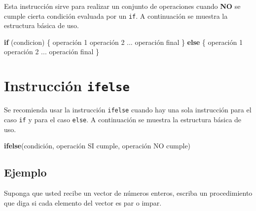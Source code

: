 \documentclass[10pt,]{krantz}
\makeatletter
\newenvironment{Shaded}{\begin{snugshade}}{\end{snugshade}}
\newcommand{\KeywordTok}[1]{\textcolor[rgb]{0.13,0.29,0.53}{\textbf{#1}}}
\newcommand{\DecValTok}[1]{\textcolor[rgb]{0.00,0.00,0.81}{#1}}
\newcommand{\StringTok}[1]{\textcolor[rgb]{0.31,0.60,0.02}{#1}}
\newcommand{\ControlFlowTok}[1]{\textcolor[rgb]{0.13,0.29,0.53}{\textbf{#1}}}
\newcommand{\OperatorTok}[1]{\textcolor[rgb]{0.81,0.36,0.00}{\textbf{#1}}}
\newcommand{\NormalTok}[1]{#1}
\newenvironment{kframe}{%
\medskip{}
\setlength{\fboxsep}{.8em}
 \def\at@end@of@kframe{}%
 \ifinner\ifhmode%
  \def\at@end@of@kframe{\end{minipage}}%
  \begin{minipage}{\columnwidth}%
 \fi\fi%
 \def\FrameCommand##1{\hskip\@totalleftmargin \hskip-\fboxsep
 \colorbox{shadecolor}{##1}\hskip-\fboxsep
     \hskip-\linewidth \hskip-\@totalleftmargin \hskip\columnwidth}%
 \MakeFramed {\advance\hsize-\width
   \@totalleftmargin\z@ \linewidth\hsize
   \@setminipage}}%
 {\par\unskip\endMakeFramed%
 \at@end@of@kframe}
\renewenvironment{Shaded}{\begin{kframe}}{\end{kframe}}
\makeatother
\begin{document}
Esta instrucción sirve para realizar un conjunto de operaciones cuando
\textbf{NO} se cumple cierta condición evaluada por un \texttt{if}. A
continuación se muestra la estructura básica de uso.

\begin{Shaded}
\begin{Highlighting}[]
\ControlFlowTok{if}\NormalTok{ (condicion) \{}
\NormalTok{  operación }\DecValTok{1}
\NormalTok{  operación }\DecValTok{2}
\NormalTok{  ...}
\NormalTok{  operación final}
\NormalTok{\}}
\ControlFlowTok{else}\NormalTok{ \{}
\NormalTok{  operación }\DecValTok{1}
\NormalTok{  operación }\DecValTok{2}
\NormalTok{  ...}
\NormalTok{  operación final}
\NormalTok{\}}
\end{Highlighting}
\end{Shaded}

\section{\texorpdfstring{Instrucción \texttt{ifelse}
}{Instrucción ifelse }}\label{instruccion-ifelse}

Se recomienda usar la instrucción \texttt{ifelse} cuando hay una sola
instrucción para el caso \texttt{if} y para el caso \texttt{else}. A
continuación se muestra la estructura básica de uso.

\begin{Shaded}
\begin{Highlighting}[]
\KeywordTok{ifelse}\NormalTok{(condición, operación SI cumple, operación NO cumple)}
\end{Highlighting}
\end{Shaded}

\subsection*{Ejemplo}\label{ejemplo-16}


Suponga que usted recibe un vector de números enteros, escriba un
procedimiento que diga si cada elemento del vector es par o impar.

\begin{Shaded}
\end{Shaded}
\end{document}

